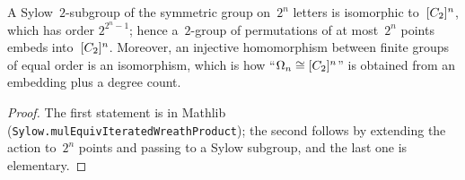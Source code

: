 \begin{lemma}
  \label{lem:sylowwreath}
  \leanok
  A Sylow~$2$-subgroup of the symmetric group on~$2^n$ letters is isomorphic to~$[C_2]^{n}$, which
  has order $2^{2^n - 1}$; hence a~$2$-group of permutations of at most~$2^n$ points embeds
  into~$[C_2]^{n}$. Moreover, an injective homomorphism between finite groups of equal order is an
  isomorphism, which is how ``$\Omega_n \cong [C_2]^{n}$'' is obtained from an embedding plus a degree
  count.
\end{lemma}
\begin{proof}
  \leanok
  The first statement is in Mathlib (\texttt{Sylow.mulEquivIteratedWreathProduct}); the second
  follows by extending the action to~$2^n$ points and passing to a Sylow subgroup, and the last
  one is elementary.
\end{proof}

